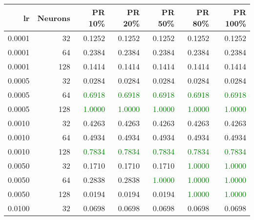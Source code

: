 \begin{tabular}{rrrrrrr}
\toprule
lr & Neurons & PR 10\% & PR 20\% & PR 50\% & PR 80\% & PR 100\% \\
\midrule
0.0001 & 32 & \textcolor{blu} {0.1252} & \textcolor{blu} {0.1252} & \textcolor{blu} {0.1252} & \textcolor{blu} {0.1252} & \textcolor{blu} {0.1252} \\
0.0001 & 64 & \textcolor{blu} {0.2384} & \textcolor{blu} {0.2384} & \textcolor{blu} {0.2384} & \textcolor{blu} {0.2384} & \textcolor{blu} {0.2384} \\
0.0001 & 128 & \textcolor{blu} {0.1414} & \textcolor{blu} {0.1414} & \textcolor{blu} {0.1414} & \textcolor{blu} {0.1414} & \textcolor{blu} {0.1414} \\
0.0005 & 32 & \textcolor{blu} {0.0284} & \textcolor{blu} {0.0284} & \textcolor{blu} {0.0284} & \textcolor{blu} {0.0284} & \textcolor{blu} {0.0284} \\
0.0005 & 64 & \textcolor{green} {0.6918} & \textcolor{green} {0.6918} & \textcolor{green} {0.6918} & \textcolor{green} {0.6918} & \textcolor{green} {0.6918} \\
0.0005 & 128 & \textcolor{green} {1.0000} & \textcolor{green} {1.0000} & \textcolor{green} {1.0000} & \textcolor{green} {1.0000} & \textcolor{green} {1.0000} \\
0.0010 & 32 & \textcolor{blu} {0.4263} & \textcolor{blu} {0.4263} & \textcolor{blu} {0.4263} & \textcolor{blu} {0.4263} & \textcolor{blu} {0.4263} \\
0.0010 & 64 & \textcolor{blu} {0.4934} & \textcolor{blu} {0.4934} & \textcolor{blu} {0.4934} & \textcolor{blu} {0.4934} & \textcolor{blu} {0.4934} \\
0.0010 & 128 & \textcolor{green} {0.7834} & \textcolor{green} {0.7834} & \textcolor{green} {0.7834} & \textcolor{green} {0.7834} & \textcolor{green} {0.7834} \\
0.0050 & 32 & \textcolor{blu} {0.1710} & \textcolor{blu} {0.1710} & \textcolor{blu} {0.1710} & \textcolor{green} {1.0000} & \textcolor{green} {1.0000} \\
0.0050 & 64 & \textcolor{blu} {0.2838} & \textcolor{blu} {0.2838} & \textcolor{green} {1.0000} & \textcolor{green} {1.0000} & \textcolor{green} {1.0000} \\
0.0050 & 128 & \textcolor{blu} {0.0194} & \textcolor{blu} {0.0194} & \textcolor{blu} {0.0194} & \textcolor{green} {1.0000} & \textcolor{green} {1.0000} \\
0.0100 & 32 & \textcolor{blu} {0.0698} & \textcolor{blu} {0.0698} & \textcolor{blu} {0.0698} & \textcolor{blu} {0.0698} & \textcolor{blu} {0.0698} \\

\end{tabular}
